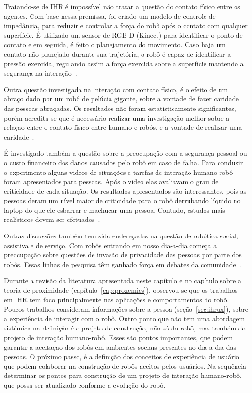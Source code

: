 Tratando-se de IHR é impossível não tratar a questão do contato físico entre os agentes. Com base nessa premissa, foi criado um modelo de controle de impedância, para reduzir e controlar a força do robô após o contato com qualquer superfície. É utilizado um sensor de RGB-D (Kinect) para identificar o ponto de contato e em seguida, é feito o planejamento do movimento. Caso haja um contato não planejado durante sua trajetória, o robô é capaz de identificar a pressão exercida, regulando assim a força exercida sobre a superfície mantendo a segurança na interação~\cite{magrini:2015}.

Outra questão investigada na interação com contato físico, é o efeito de um abraço dado por um robô de pelúcia gigante, sobre a vontade de fazer caridade das pessoas abraçadas. Os resultados não foram estatisticamente significantes, porém acredita-se que é necessário realizar uma investigação melhor sobre a relação entre o contato físico entre humano e robôs, e a vontade de realizar uma caridade~\cite{nakata:2017}.

É investigado também a questão sobre a preocupação com a segurança pessoal ou o custo financeiro dos danos causados pelo robô em caso de falha. Para conduzir o experimento alguns videos de situações e tarefas de interação humano-robô foram apresentados para pessoas. Após o video elas avaliavam o grau de criticidade de cada situação.
Os resultados apresentados são interessantes, pois as pessoas deram um nível maior de criticidade para o robô derrubando líquido no laptop do que ele esbarrar e machucar uma pessoa. Contudo, estudos mais realísticos devem ser efetuados~\cite{adubor:2017}.

Outras discussões também tem sido endereçadas na questão de robótica social, assistiva e de serviço. Com robôs entrando em nosso dia-a-dia começa a preocupação sobre questões de invasão de privacidade das pessoas por parte dos robôs. Essas linhas de pesquisa têm ganhado força em debates da comunidade~\cite{rueben:2017}.

Durante a revisão da literatura apresentada neste capítulo e no capítulo sobre a teoria de proximidade (capítulo~\ref{cap:proxemics}), observou-se que os trabalhos em IHR tem foco principalmente nas aplicações e comportamentos do robô. Poucos trabalhos consideram informações sobre a pessoa (seção~\ref{sec:ihrux}), sobre a experiência de interagir com o robô. Outro ponto que não tem uma abordagem sistêmica na definição é o projeto de construção, não só do robô, mas também do projeto de interação humano-robô. Esses são pontos importantes, que podem garantir a aceitação dos robôs em ambientes sociais presentes no dia-a-dia das pessoas. O próximo passo, é a definição dos conceitos de experiência de usuário que podem colaborar na construção de robôs aceitos pelos usuários. Na sequência determinar os pontos para construção de um projeto de interação humano-robô, que possa ser atualizado conforme a evolução do robô.
